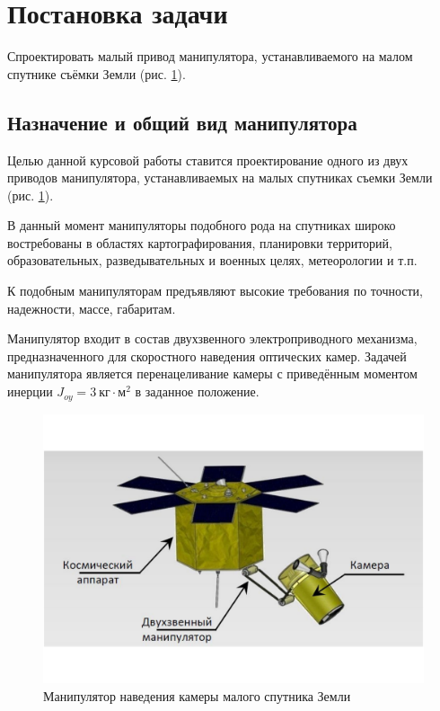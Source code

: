 \ifdefined\DIPLOMA
    \section{Постановка задачи}

    Спроектировать малый привод манипулятора, устанавливаемого на малом спутнике
    съёмки Земли (рис. \ref{sattelite_general_view}).
\else
    \subsection{Назначение и общий вид манипулятора}

    Целью данной курсовой работы ставится проектирование одного из двух
    приводов манипулятора, устанавливаемых на малых спутниках съемки Земли
    (рис. \ref{sattelite_general_view}).

    В данный момент манипуляторы подобного рода на спутниках широко востребованы
    в областях картографирования, планировки территорий, образовательных,
    разведывательных и военных целях, метеорологии и т.п.

    К подобным манипуляторам предъявляют высокие требования по точности,
    надежности, массе, габаритам.
\fi

Манипулятор входит в состав двухзвенного электроприводного механизма,
предназначенного для скоростного наведения оптических камер.
Задачей манипулятора является перенацеливание камеры с приведённым
моментом инерции $J_{oy} = 3 ~\text{кг} \cdot \text{м}^2$ в заданное положение.

\begin{figure}[h!]
    \centering
    \includegraphics[width=\textwidth, keepaspectratio, clip=true, trim=3cm 3cm 3cm 3cm]
                    {./src/pictures/sattelite_3d_images/general_view}
    \caption{Манипулятор наведения камеры малого спутника Земли}
    \label{sattelite_general_view}
\end{figure}

